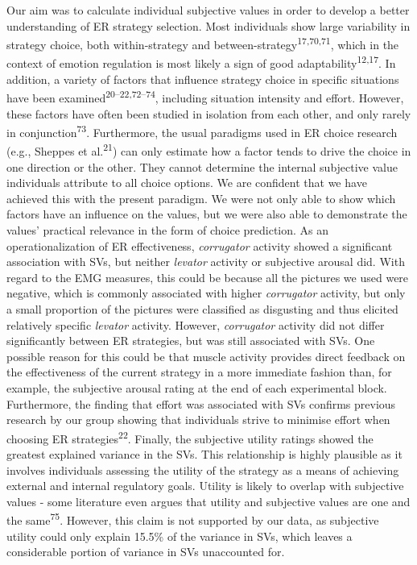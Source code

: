 \documentclass[
  man,floatsintext]{apa6}
\begin{document}
Our aim was to calculate individual subjective values in order to develop a better understanding of ER strategy selection.
Most individuals show large variability in strategy choice, both within-strategy and between-strategy\textsuperscript{17,70,71}, which in the context of emotion regulation is most likely a sign of good adaptability\textsuperscript{12,17}.
In addition, a variety of factors that influence strategy choice in specific situations have been examined\textsuperscript{20--22,72--74}, including situation intensity and effort.
However, these factors have often been studied in isolation from each other, and only rarely in conjunction\textsuperscript{73}.
Furthermore, the usual paradigms used in ER choice research (e.g., Sheppes et al.\textsuperscript{21}) can only estimate how a factor tends to drive the choice in one direction or the other.
They cannot determine the internal subjective value individuals attribute to all choice options.
We are confident that we have achieved this with the present paradigm.
We were not only able to show which factors have an influence on the values, but we were also able to demonstrate the values' practical relevance in the form of choice prediction.
As an operationalization of ER effectiveness, \emph{corrugator} activity showed a significant association with SVs, but neither \emph{levator} activity or subjective arousal did.
With regard to the EMG measures, this could be because all the pictures we used were negative, which is commonly associated with higher \emph{corrugator} activity, but only a small proportion of the pictures were classified as disgusting and thus elicited relatively specific \emph{levator} activity.
However, \emph{corrugator} activity did not differ significantly between ER strategies, but was still associated with SVs.
One possible reason for this could be that muscle activity provides direct feedback on the effectiveness of the current strategy in a more immediate fashion than, for example, the subjective arousal rating at the end of each experimental block.
Furthermore, the finding that effort was associated with SVs confirms previous research by our group showing that individuals strive to minimise effort when choosing ER strategies\textsuperscript{22}.
Finally, the subjective utility ratings showed the greatest explained variance in the SVs.
This relationship is highly plausible as it involves individuals assessing the utility of the strategy as a means of achieving external and internal regulatory goals.
Utility is likely to overlap with subjective values - some literature even argues that utility and subjective values are one and the same\textsuperscript{75}.
However, this claim is not supported by our data, as subjective utility could only explain 15.5\% of the variance in SVs, which leaves a considerable portion of variance in SVs unaccounted for.
\end{document}
